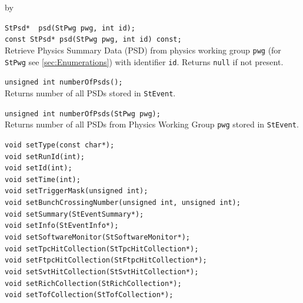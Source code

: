 \documentclass[twoside]{article}
\newcommand{\entrylabel}[1]{\mbox{\textbf{{#1}}}\hfil}%
\newenvironment{entry}
{\begin{list}{}%
    {\renewcommand{\makelabel}{\entrylabel}%
     \setlength{\labelwidth}{90pt}%
     \setlength{\leftmargin}{\labelwidth}
     \advance\leftmargin by \labelsep%
      }%
    }%
  {\end{list}}
\newcommand{\Entrylabel}[1]%
{\raisebox{0pt}[1ex][0pt]{\makebox[\labelwidth][l]%
    {\parbox[t]{\labelwidth}{\hspace{0pt}\textbf{{#1}}}}}}
\newenvironment{Entry}%
{\renewcommand{\entrylabel}{\Entrylabel}\begin{entry}}%
  {\end{entry}}
\begin{document}
\begin{Entry}
    \verb+StPsd*  psd(StPwg pwg, int id);+\\ 
    \verb+const StPsd* psd(StPwg pwg, int id) const;+\\
    Retrieve Physics Summary Data (PSD) from physics working group \texttt{pwg}
    (for \texttt{StPwg} see \ref{sec:Enumerations}) with identifier \texttt{id}.
    Returns \texttt{null} if not present.
        
    \verb+unsigned int numberOfPsds();+\\
    Returns number of all PSDs stored in \texttt{StEvent}.

    \verb+unsigned int numberOfPsds(StPwg pwg);+\\ 
    Returns number of all PSDs from Physics Working Group \texttt{pwg} stored in \texttt{StEvent}.

    \verb+void setType(const char*);+\\

    \verb+void setRunId(int);+\\

    \verb+void setId(int);+\\

    \verb+void setTime(int);+\\

    \verb+void setTriggerMask(unsigned int);+\\

    \verb+void setBunchCrossingNumber(unsigned int, unsigned int);+\\

    \verb+void setSummary(StEventSummary*);+\\

    \verb+void setInfo(StEventInfo*);+\\

    \verb+void setSoftwareMonitor(StSoftwareMonitor*);+\\

    \verb+void setTpcHitCollection(StTpcHitCollection*);+\\

    \verb+void setFtpcHitCollection(StFtpcHitCollection*);+\\

    \verb+void setSvtHitCollection(StSvtHitCollection*);+\\

    \verb+void setRichCollection(StRichCollection*);+\\

    \verb+void setTofCollection(StTofCollection*);+\\


\end{Entry}
\end{document}
